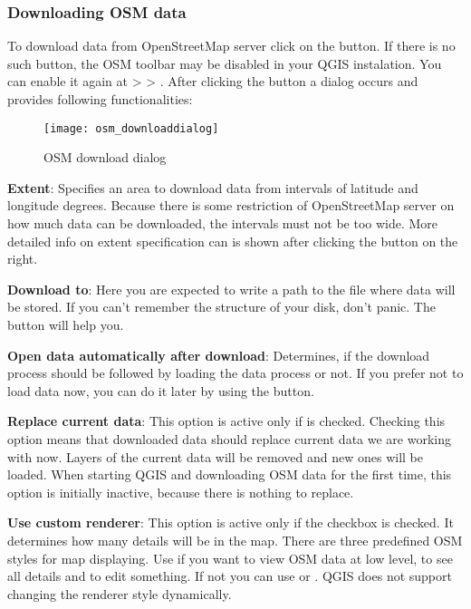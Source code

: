 \subsubsection{Downloading OSM data}  

To download data from OpenStreetMap server click on the 
 button. If there is no 
such button, the OSM toolbar may be disabled in your QGIS instalation.
You can enable it again at  > 
 > . After clicking the 
button a dialog occurs and provides following functionalities:

\begin{figure}[ht]
   \begin{center}
   \caption{OSM download dialog \nixcaption}\label{fig:osmdownload}\smallskip
   \texttt{[image: osm\_downloaddialog]}
\end{center}
\end{figure}

\begin{description}
\item \textbf{Extent}: Specifies an area to download data from intervals 
of latitude and longitude degrees. Because there is some restriction of 
OpenStreetMap server on how much data can be downloaded, the intervals 
must not be too wide. More detailed info on extent specification can is 
shown after clicking the  button on 
the right.
\item \textbf{Download to}: Here you are expected to write a path to the 
file where data will be stored. If you can't remember the structure of 
your disk, don't panic. The  button will help you.
\item \textbf{Open data automatically after download}: Determines, if the 
download process should be followed by loading the data process or not. If you 
prefer not to load data now, you can do it later by using 
the  button.
\item \textbf{Replace current data}: This option is active only if 
 is checked. 
Checking this option means that downloaded data should replace
current data we are working with now. Layers of the current data will be 
removed and new ones will be loaded. When starting QGIS and downloading 
OSM data for the first time, this option is initially inactive, because 
there is nothing to replace.
\item \textbf{Use custom renderer}: This option is active only if the 
 checkbox is checked. 
It determines how many details will be in the map. There are three predefined 
OSM styles for map displaying. Use  if you want to view 
OSM data at low level, to see all details and to edit something. If not you 
can use  or . QGIS \CURRENT does 
not support changing the renderer style dynamically.
\end{description}

